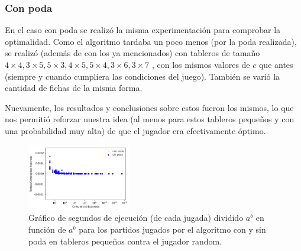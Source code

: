 \documentclass[A4paper,oneside,fleqn,11pt]{article}
\theoremstyle{definition}
\begin{document}
\subsubsection{Con poda}
En el caso con poda se realizó la misma experimentación para comprobar la optimalidad. Como el algoritmo tardaba un poco menos (por la poda realizada), se realizó (además de con los ya mencionados) con tableros de tamaño $4\times4, 3\times5, 5\times3, 4\times5, 5\times4, 3\times6, 3\times7$ , con los mismos valores de $c$ que antes (siempre y cuando cumpliera las condiciones del juego). También se varió la cantidad de fichas de la misma forma.

Nuevamente, los resultados y conclusiones sobre estos fueron los mismos, lo que nos permitió reforzar nuestra idea (al menos para estos tableros pequeños y con una probabilidad muy alta) de que el jugador era efectivamente óptimo.



\begin{figure}
	\includegraphics[width=0.4\textwidth]{complejidad1.png}
	\caption{ Gráfico de segundos de ejecución (de cada jugada) dividido $a^b$ en función de $a^b$ para los partidos jugados por el algoritmo con y sin poda en tableros pequeños contra el jugador random.}
\end{figure}
\end{document}

